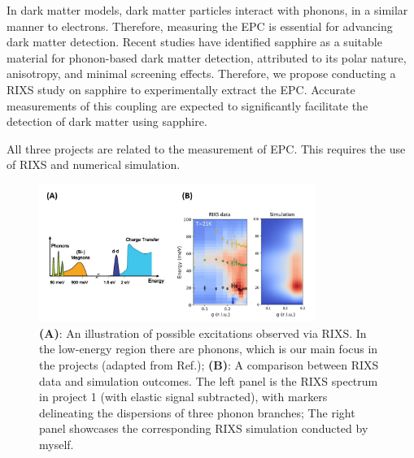 \documentclass[11pt]{article}
\begin{document}
In dark matter models, dark matter particles interact with phonons, in a similar manner to electrons\cite{griffin_directional_2018}. Therefore, measuring the EPC is essential for advancing dark matter detection. 
Recent studies have identified sapphire as a suitable material for phonon-based dark matter detection, attributed to its polar nature, anisotropy, and minimal screening effects\cite{griffin_directional_2018}.
Therefore, we propose conducting a RIXS study on sapphire to experimentally extract the EPC. Accurate measurements of this coupling are expected to significantly facilitate the detection of dark matter using sapphire.

All three projects are related to the measurement of EPC. This requires the use of RIXS and numerical simulation.

\begin{figure}[!t]
    \centering
    \includegraphics[width=0.8\textwidth]{figures/new_figure2.jpg}
    \caption{\textbf{(A)}: An illustration of possible excitations observed via RIXS. In the low-energy region there are phonons, which is our main focus in the projects (adapted from Ref.\cite{ament_resonant_2011}); \textbf{(B)}: A comparison between RIXS data and simulation outcomes. The left panel is the RIXS spectrum in project 1 (with elastic signal subtracted), with markers delineating the dispersions of three phonon branches; The right panel showcases the corresponding RIXS simulation conducted by myself.}  
    \label{simulation}
\end{figure}
\end{document}
